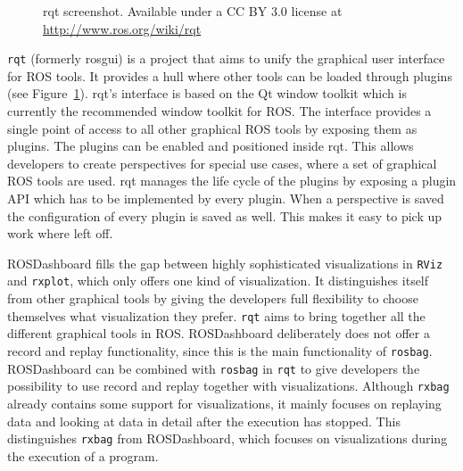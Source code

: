 \begin{figure}[p]
  \centering
  \caption{rqt screenshot. Available under a CC BY 3.0 license at \url{http://www.ros.org/wiki/rqt}}
  \label{rqt_screenshot}
\end{figure}

\texttt{rqt} (formerly rosgui) is a project that aims to unify the graphical user interface for ROS tools. It provides a hull where other tools can be loaded through plugins (see Figure~\ref{rqt_screenshot}). rqt's interface is based on the Qt window toolkit which is currently the recommended window toolkit for ROS. The interface provides a single point of access to all other graphical ROS tools by exposing them as plugins. The plugins can be enabled and positioned inside rqt. This allows developers to create perspectives for special use cases, where a set of graphical ROS tools are used. rqt manages the life cycle of the plugins by exposing a plugin API which has to be implemented by every plugin. When a perspective is saved the configuration of every plugin is saved as well. This makes it easy to pick up work where left off.

ROSDashboard fills the gap between highly sophisticated visualizations in \texttt{RViz} and \texttt{rxplot}, which only offers one kind of visualization. It distinguishes itself from other graphical tools by giving the developers full flexibility to choose themselves what visualization they prefer. \texttt{rqt} aims to bring together all the different graphical tools in ROS. ROSDashboard deliberately does not offer a record and replay functionality, since this is the main functionality of \texttt{rosbag}. ROSDashboard can be combined with \texttt{rosbag} in \texttt{rqt} to give developers the possibility to use record and replay together with visualizations. Although \texttt{rxbag} already contains some support for visualizations, it mainly focuses on replaying data and looking at data in detail after the execution has stopped. This distinguishes \texttt{rxbag} from ROSDashboard, which focuses on visualizations during the execution of a program.

